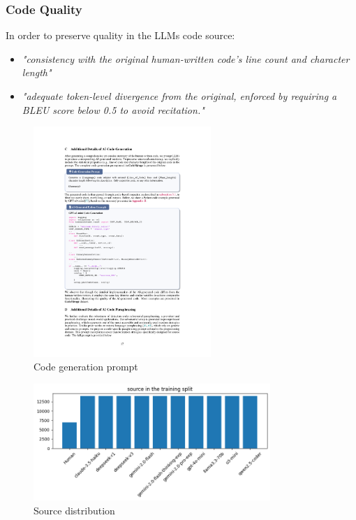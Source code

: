 \subsubsection*{Code Quality}
In order to preserve quality in the LLMs code source:
\begin{itemize}
    \item \textit{"consistency with the original human-written code's line count and character length"}
    \item \textit{"adequate token-level divergence from the original, enforced by requiring a 
    BLEU \cite{papineni2002bleu} score below 0.5 to avoid recitation."} 
\end{itemize}




\begin{figure}[H]
    \centering
    \includegraphics[width=0.6\textwidth]{img/CodeMirage/Propt_Generation.pdf}
    \caption{Code generation prompt}
    \label{fig:propt_generation}
\end{figure}




\begin{figure}[H]
    \centering
    \includegraphics[width=0.8\textwidth]{img/CodeMirage/source.png}
    \caption{Source distribution}
    \label{fig:distribution}
\end{figure}


